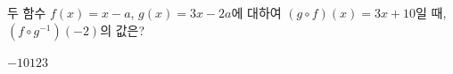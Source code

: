 두 함수 $f(x)=x-a$, $g(x)=3x-2a$에 대하여 $(g\circ f)(x)=3x+10$일 때, $(f\circ g^{-1})(-2)$의 값은? 
\begin{choices32}{$-1$}{$0$}{$1$}{$2$}{$3$}\end{choices32}

